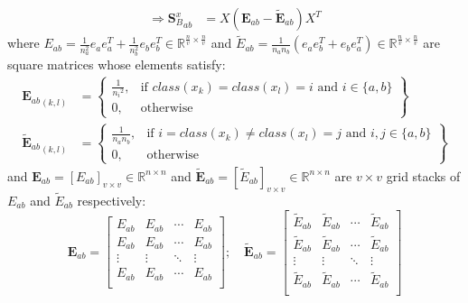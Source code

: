 \begin{appendix}
\begin{equation}
\begin{split}
        \Rightarrow {\boldsymbol{S}_B^x}_{ab} &= X \left(\boldsymbol{E}_{ab} - \boldsymbol{\tilde{E}}_{ab}\right) X^T
        \end{split}
        \label{eq:pcmvda_Sb_i_derivation}
    \end{equation}
    where $E_{ab} = \frac{1}{n_a^2}e_a e_a^T + \frac{1}{n_b^2}e_b e_b^T \in \mathbb{R}^{\frac{n}{v}\times \frac{n}{v}}$ and $\tilde{E}_{ab} = \frac{1}{n_a n_b}\left(e_a e_b^T + e_b e_a^T\right) \in \mathbb{R}^{\frac{n}{v}\times \frac{n}{v}}$ are square matrices whose elements satisfy:
    \begin{align}
        {\boldsymbol{E}_{ab}}_{(k,l)} &= \left\{\begin{array}{lr}
            \frac{1}{{n_i}^2}, & \text{if } class(x_k) = class(x_l) = i \text{ and } i \in \{a, b\} \\
            0, & \text{otherwise}
            \end{array}\right\} \\
        {\boldsymbol{\tilde{E}}_{ab}}_{(k,l)} &= \left\{\begin{array}{lr}
            \frac{1}{n_a n_b}, & \text{if } i = class(x_k) \neq class(x_l) = j \text{ and } i,j \in \{a, b\} \\
            0, & \text{otherwise}
            \end{array}\right\}
    \end{align}
    and $\boldsymbol{E}_{ab} = \left[E_{ab}\right]_{v \times v} \in \mathbb{R}^{n\times n}$ and $\boldsymbol{\tilde{E}}_{ab} = \left[\tilde{E}_{ab}\right]_{v \times v} \in \mathbb{R}^{n\times n}$ are $v \times v$ grid stacks of $E_{ab}$ and $\tilde{E}_{ab}$ respectively:
    \begin{equation}
        \boldsymbol{E}_{ab} = \left[\begin{matrix}E_{ab}&E_{ab}&\cdots&E_{ab}\\E_{ab}&E_{ab}&\cdots&E_{ab}\\\vdots&\vdots&\ddots&\vdots\\E_{ab}&E_{ab}&\cdots&E_{ab}\\\end{matrix}\right]; \quad
        \boldsymbol{\tilde{E}}_{ab} = \left[\begin{matrix}\tilde{E}_{ab}&\tilde{E}_{ab}&\cdots&\tilde{E}_{ab}\\\tilde{E}_{ab}&\tilde{E}_{ab}&\cdots&\tilde{E}_{ab}\\\vdots&\vdots&\ddots&\vdots\\\tilde{E}_{ab}&\tilde{E}_{ab}&\cdots&\tilde{E}_{ab}\\\end{matrix}\right]
    \end{equation}

\normalsize
\end{appendix}
